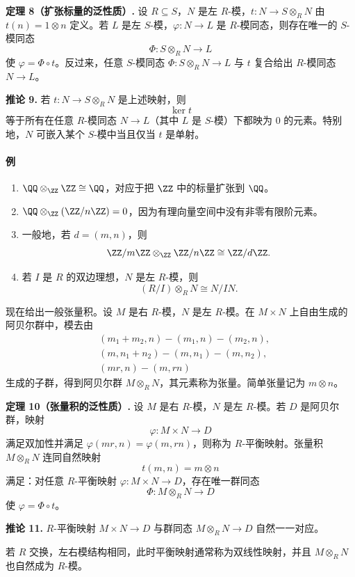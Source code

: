 \noindent\textbf{定理 8（扩张标量的泛性质）.} 设 $R\subseteq S$，$N$ 是左 $R$-模，$t:N\to S\otimes_R N$ 由 $t(n)=1\otimes n$ 定义。若 $L$ 是左 $S$-模，$\varphi:N\to L$ 是 $R$-模同态，则存在唯一的 $S$-模同态
\[
\Phi:S\otimes_R N\longrightarrow L
\]
使 $\varphi=\Phi\circ t$。反过来，任意 $S$-模同态 $\Phi:S\otimes_R N\to L$ 与 $t$ 复合给出 $R$-模同态 $N\to L$。


\noindent\textbf{推论 9.} 若 $t:N\to S\otimes_R N$ 是上述映射，则
\[
\ker t
\]
等于所有在任意 $R$-模同态 $N\to L$（其中 $L$ 是 $S$-模）下都映为 $0$ 的元素。特别地，$N$ 可嵌入某个 $S$-模中当且仅当 $t$ 是单射。

\paragraph{例}
\begin{enumerate}[label=(\arabic*)]
	\item $\QQ\otimes_\ZZ \ZZ\cong \QQ$，对应于把 $\ZZ$ 中的标量扩张到 $\QQ$。
	\item $\QQ\otimes_\ZZ (\ZZ/n\ZZ)=0$，因为有理向量空间中没有非零有限阶元素。
	\item 一般地，若 $d=(m,n)$，则
	\[
	\ZZ/m\ZZ\otimes_\ZZ \ZZ/n\ZZ\cong \ZZ/d\ZZ.
	\]
	\item 若 $I$ 是 $R$ 的双边理想，$N$ 是左 $R$-模，则
	\[
	(R/I)\otimes_R N\cong N/IN.
	\]
\end{enumerate}

现在给出一般张量积。设 $M$ 是右 $R$-模，$N$ 是左 $R$-模。在 $M\times N$ 上自由生成的阿贝尔群中，模去由
\[
\begin{aligned}
	&(m_1+m_2,n)-(m_1,n)-(m_2,n),\\
	&(m,n_1+n_2)-(m,n_1)-(m,n_2),\\
	&(mr,n)-(m,rn)
\end{aligned}
\]
生成的子群，得到阿贝尔群 $M\otimes_R N$，其元素称为张量。简单张量记为 $m\otimes n$。


\noindent\textbf{定理 10（张量积的泛性质）.} 设 $M$ 是右 $R$-模，$N$ 是左 $R$-模。若 $D$ 是阿贝尔群，映射
\[
\varphi:M\times N\longrightarrow D
\]
满足双加性并满足 $\varphi(mr,n)=\varphi(m,rn)$，则称为 $R$-平衡映射。张量积 $M\otimes_R N$ 连同自然映射
\[
t(m,n)=m\otimes n
\]
满足：对任意 $R$-平衡映射 $\varphi:M\times N\to D$，存在唯一群同态
\[
\Phi:M\otimes_R N\longrightarrow D
\]
使 $\varphi=\Phi\circ t$。


\noindent\textbf{推论 11.} $R$-平衡映射 $M\times N\to D$ 与群同态 $M\otimes_R N\to D$ 自然一一对应。

若 $R$ 交换，左右模结构相同，此时平衡映射通常称为双线性映射，并且 $M\otimes_R N$ 也自然成为 $R$-模。


